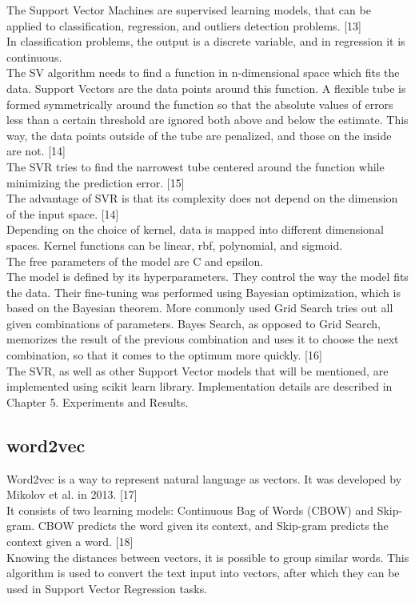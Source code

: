 \documentclass[times, utf8, zavrsni, english]{fer}
\begin{document}
The Support Vector Machines are supervised learning models, that can be applied to classification, regression, and outliers detection problems. [13] \\
In classification problems, the output is a discrete variable, and in regression it is continuous. \\
The SV algorithm needs to find a function in n-dimensional space which fits the data. 
Support Vectors are the data points around this function. A flexible tube is formed symmetrically around the function so that the absolute values of errors less than a certain threshold are ignored both above and below the estimate. This way, the data points outside of the tube are penalized, and those on the inside are not. [14] \\
The SVR tries to find the narrowest tube centered around the function while minimizing the prediction error. [15] \\

The advantage of SVR is that its complexity does not depend on the dimension of the input space. [14] \\

Depending on the choice of kernel, data is mapped into different dimensional spaces. Kernel functions can be linear, rbf, polynomial, and sigmoid. \\
The free parameters of the model are C and epsilon. \\
The model is defined by its hyperparameters. They control the way the model fits the data. Their fine-tuning was performed using Bayesian optimization, which is based on the Bayesian theorem. More commonly used Grid Search tries out all given combinations of parameters. Bayes Search, as opposed to Grid Search, memorizes the result of the previous combination and uses it to choose the next combination, so that it comes to the optimum more quickly. [16] \\

The SVR, as well as other Support Vector models that will be mentioned, are implemented using scikit learn library. Implementation details are described in Chapter 5. Experiments and Results.

\subsection{word2vec}
Word2vec is a way to represent natural language as vectors. It was developed by Mikolov et al. in 2013. [17] \\
It consists of two learning models: Continuous Bag of Words (CBOW) and Skip-gram. CBOW predicts the word given its context, and Skip-gram predicts the context given a word. [18] \\
Knowing the distances between vectors, it is possible to group similar words.
This algorithm is used to convert the text input into vectors, after which they can be used in Support Vector Regression tasks.
\end{document}
